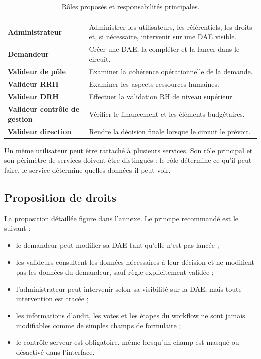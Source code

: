 \begin{table}[htbp]
\centering
\small
\begin{tabularx}{\textwidth}{>{\bfseries}p{}Y}
\toprule
{}
 &  \\
\midrule
Administrateur & Administrer les utilisateurs, les référentiels, les droits et, si nécessaire, intervenir sur une DAE visible. \\
Demandeur & Créer une DAE, la compléter et la lancer dans le circuit. \\
Valideur de pôle & Examiner la cohérence opérationnelle de la demande. \\
Valideur RRH & Examiner les aspects ressources humaines. \\
Valideur DRH & Effectuer la validation RH de niveau supérieur. \\
Valideur contrôle de gestion & Vérifier le financement et les éléments budgétaires. \\
Valideur direction & Rendre la décision finale lorsque le circuit le prévoit. \\
\bottomrule
\end{tabularx}
\caption{Rôles proposés et responsabilités principales.}
\label{tab:roles-proposes}
\end{table}

Un même utilisateur peut être rattaché à plusieurs services. Son rôle principal et son périmètre de services doivent être distingués : le rôle détermine ce qu'il peut faire, le service détermine quelles données il peut voir.

\subsection{Proposition de droits}

La proposition détaillée figure dans l'annexe. Le principe recommandé est le suivant :

\begin{itemize}
  \item le demandeur peut modifier sa DAE tant qu'elle n'est pas lancée ;
  \item les valideurs consultent les données nécessaires à leur décision et ne modifient pas les données du demandeur, sauf règle explicitement validée ;
  \item l'administrateur peut intervenir selon sa visibilité sur la DAE, mais toute intervention est tracée ;
  \item les informations d'audit, les votes et les étapes du workflow ne sont jamais modifiables comme de simples champs de formulaire ;
  \item le contrôle serveur est obligatoire, même lorsqu'un champ est masqué ou désactivé dans l'interface.
\end{itemize}

